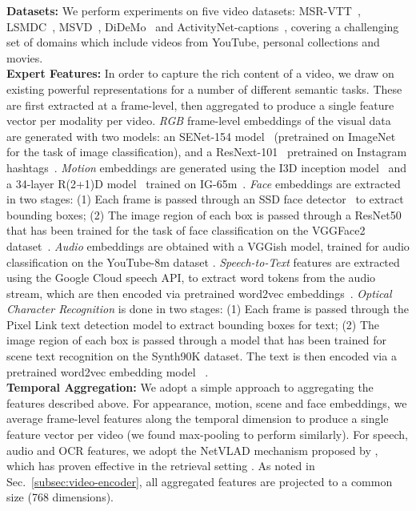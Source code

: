 \documentclass{bmvc2k}
\begin{document}
\noindent\textbf{Datasets:} We perform experiments on five video datasets:  MSR-VTT~\cite{xu2016msr}, LSMDC~\cite{rohrbach2015dataset}, MSVD~\cite{chen2011collecting}, DiDeMo~\cite{anne2017localizing} and ActivityNet-captions~\cite{krishna2017dense}, covering a challenging set of domains which include videos from YouTube, personal collections and movies. \\
\noindent\textbf{Expert Features:} In order to capture the rich content of a video, we draw on existing powerful representations for a number of different semantic tasks. These are first extracted at a frame-level, then aggregated to produce a single feature vector per modality per video. 
\textit{RGB } frame-level embeddings of the visual data are generated with two models: an SENet-154 model~\cite{hu2019squeeze} (pretrained on ImageNet for the task of image classification), and a ResNext-101~\cite{xie2017aggregated} pretrained on Instagram hashtags~\cite{mahajan2018exploring}. \textit{Motion} embeddings are generated using the I3D inception model~\cite{carreira2017quo} and a 34-layer R(2+1)D model~\cite{tran2018closer} trained on IG-65m~\cite{ghadiyaram2019large}. \textit{Face} embeddings are extracted in two stages: (1) Each frame is passed through an SSD face detector~\cite{liu2016ssd,opencv_library} to extract bounding boxes; (2) The image region of each box is passed through a ResNet50~\cite{he2016identity} that has been trained for the task of face classification on the VGGFace2 dataset~\cite{Cao18}. 
\textit{Audio} embeddings are obtained with a VGGish model, trained for audio classification on the YouTube-8m dataset \cite{hershey2017}. \textit{Speech-to-Text} features are extracted using the Google Cloud speech API, to extract word tokens from the audio stream, which are then encoded via pretrained word2vec embeddings~\cite{mikolov2013efficient}. \textit{Optical Character Recognition} is done in two stages: (1) Each frame is passed through the Pixel Link \cite{deng2018pixellink} text detection model to extract bounding boxes for text; (2) The image region of each box is passed through a model \cite{liu2018synthetically} that has been trained for scene text recognition on the Synth90K dataset\cite{jaderberg2014synthetic}. The text is then encoded via a pretrained word2vec embedding model ~\cite{mikolov2013efficient}. \\
\noindent \textbf{Temporal Aggregation:} We adopt a simple approach to aggregating the features described above.  For appearance, motion, scene and face embeddings, we average frame-level features along the temporal dimension to produce a single feature vector per video (we found max-pooling to perform similarly).  For speech, audio and OCR features, we adopt the NetVLAD mechanism proposed by \cite{arandjelovic2016netvlad}, which has proven effective in the retrieval setting \cite{miech2017learnable}. As noted in Sec.~\ref{subsec:video-encoder}, all aggregated features are projected to a common size (768 dimensions). \\
\end{document}
